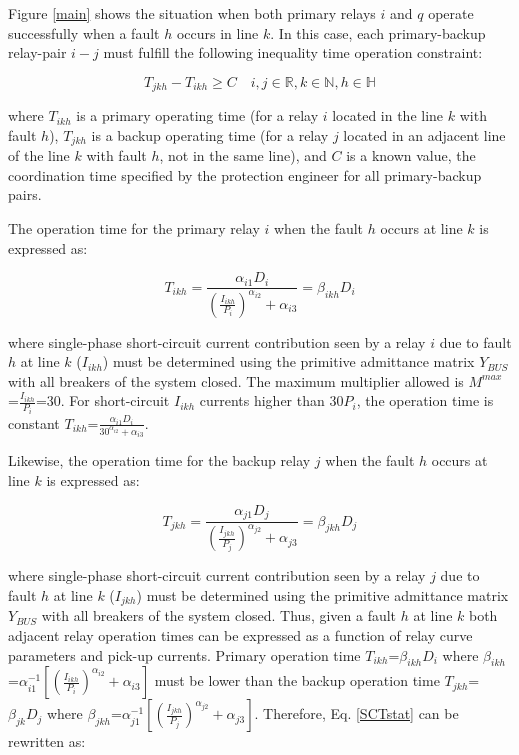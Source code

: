 \documentclass[letterpaper, 10 pt, conference]{IEEEtran}
\begin{document}
Figure \ref{main} shows the situation when both primary relays $i$ and $q$  operate successfully when a fault $h$ occurs in line $k$. In this case, each primary-backup relay-pair $i-j$ must fulfill the following inequality time operation constraint:


\begin{equation} \label{SCTstat}
  T_{jkh}-T_{ikh}\geq C\quad i,j\in \mathds{R}, k\in \mathds{N}, h\in \mathds{H}
\end{equation}

where $T_{ikh}$ is a primary  operating time (for a relay $i$ located in the line $k$ with fault $h$),  $T_{jkh}$ is a backup operating time (for a relay $j$ located in an adjacent line of the line $k$ with fault $h$, not in the same line), and $C$ is a known value, the coordination time specified by the protection engineer for all primary-backup pairs.





The operation time for the primary relay $i$ when the fault $h$ occurs at line $k$ is expressed as:

\begin{equation}\label{primary}
  T_{ikh}=\frac{\alpha_{i1} D_{i}}{(\frac{I_{ikh}}{P_{i}})^{\alpha_{i2}}+\alpha_{i3}}=\beta_{ikh}D_{i}
\end{equation}

where single-phase short-circuit current contribution seen by a relay $i$ due to fault $h$ at line $k$ ($I_{ikh}$) must be determined using the primitive admittance matrix $Y_{BUS}$ with all breakers of the system closed. The maximum multiplier allowed is $M^{max}$=$\frac{I_{ikh}}{P_{i}}$=30. For short-circuit $I_{ikh}$ currents higher than $30{P_{i}}$, the operation time is constant  $T_{ikh}$=$\frac{\alpha_{i1} D_{i}}{30^{\alpha_{i2}}+\alpha_{i3}}$.

Likewise, the  operation time for the backup relay $j$ when the fault $h$ occurs at line $k$ is expressed as:

\begin{equation}\label{primaryxx}
  T_{jkh}=\frac{\alpha_{j1} D_{j}}{(\frac{I_{jkh}}{P_{j}})^{\alpha_{j2}}+\alpha_{j3}}=\beta_{jkh}D_{j}
\end{equation}

where single-phase short-circuit current contribution seen by a relay $j$ due to fault $h$ at line $k$ ($I_{jkh}$) must be determined using the primitive admittance matrix $Y_{BUS}$ with all breakers of the system closed. Thus, given a fault $h$ at line $k$ both adjacent relay operation times can be expressed as a function of relay curve parameters and pick-up currents. Primary operation time  $T_{ikh}$=$\beta_{ikh}D_{i}$ where $\beta_{ikh}$=${\alpha^{-1}_{i1}}{[(\frac{I_{ikh}}{P_{i}})^{\alpha_{i2}}+\alpha_{i3}]}$ must be lower than the backup operation time $T_{jkh}$=$\beta_{jk}D_{j}$ where $\beta_{jkh}$=${\alpha^{-1}_{j1}}{[(\frac{I_{jkh}}{P_{j}})^{\alpha_{j2}}+\alpha_{j3}]}$. Therefore, Eq. \ref{SCTstat} can be rewritten as:
\end{document}
